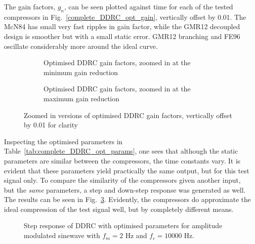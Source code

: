 \documentclass[../main2.tex]{subfiles}
\providecommand{\rootdir}{..}
\begin{document}
The gain factors, $g_n$, can be seen plotted against time for each of the tested compressors in Fig.~\ref{complete_DDRC_opt_gain}, vertically offset by 0.01. The McN84 has small very fast ripples in gain factor, while the GMR12 decoupled design is smoother but with a small static error. GMR12 branching and FE96 oscillate considerably more around the ideal curve.

\begin{figure}
\captionsetup{justification=centering}
\begin{subfigure}{\linewidth}
\centering
\centerline{}
\caption{Optimised DDRC gain factors, zoomed in at the minimum gain reduction}
\end{subfigure}

\par\bigskip

\captionsetup{justification=centering}
\begin{subfigure}{\linewidth}
\centering
\centerline{}
\caption{Optimised DDRC gain factors, zoomed in at the maximum gain reduction}
\label{fig:complete_DDRC_opt_gain}
\end{subfigure}

\caption{Zoomed in versions of optimised DDRC gain factors, vertically offset by 0.01 for clarity}
\label{fig:peak_det_opt_env_zoom}
\end{figure}

Inspecting the optimised parameters in Table~\ref{tab:complete_DDRC_opt_params}, one sees that although the static parameters are similar between the compressors, the time constants vary. It is evident that these parameters yield practically the same output, but for this test signal only. To compare the similarity of the compressors given another input, but the \emph{same} parameters, a step and down-step response was generated as well. The results can be seen in Fig.~\ref{fig:complete_DDRC_opt_step_response}. Evidently, the compressors do approximate the ideal compression of the test signal well, but by completely different means. 
\begin{figure}[h]
\centerline{}
\caption{Step response of DDRC with optimised parameters for amplitude modulated sinewave with $f_m=2$ Hz and $f_c=10000$ Hz.}
\label{fig:complete_DDRC_opt_step_response}
\end{figure}

\end{document}

